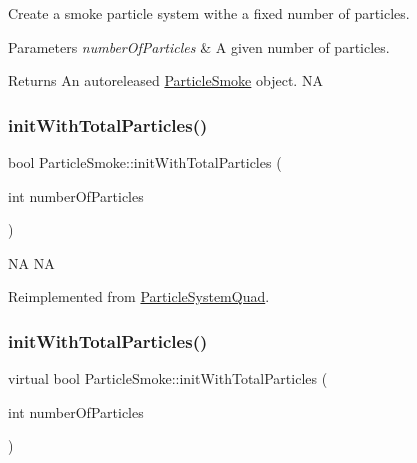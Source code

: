 Create a smoke particle system withe a fixed number of particles.


\begin{DoxyParams}{Parameters}
{\em number\+Of\+Particles} & A given number of particles. \\
\hline
\end{DoxyParams}
\begin{DoxyReturn}{Returns}
An autoreleased \hyperlink{classParticleSmoke}{Particle\+Smoke} object.  NA 
\end{DoxyReturn}
\mbox{\label{classParticleSmoke_a15a46a667c6fb570023fe68d94296b3e}} 
\subsubsection{\texorpdfstring{init\+With\+Total\+Particles()}{initWithTotalParticles()}\hspace{0.1cm}{\footnotesize\ttfamily [1/2]}}
{\footnotesize\ttfamily bool Particle\+Smoke\+::init\+With\+Total\+Particles (\begin{DoxyParamCaption}\item[{int}]{number\+Of\+Particles }\end{DoxyParamCaption})\hspace{0.3cm}{\ttfamily [virtual]}}

NA  NA 

Reimplemented from \hyperlink{classParticleSystemQuad_ae5420007b57e909c05e7476a54fbfbe9}{Particle\+System\+Quad}.

\mbox{\label{classParticleSmoke_ad06f80d20c4f8fec1d7d56beb478b72d}} 
\subsubsection{\texorpdfstring{init\+With\+Total\+Particles()}{initWithTotalParticles()}\hspace{0.1cm}{\footnotesize\ttfamily [2/2]}}
{\footnotesize\ttfamily virtual bool Particle\+Smoke\+::init\+With\+Total\+Particles (\begin{DoxyParamCaption}\item[{int}]{number\+Of\+Particles }\end{DoxyParamCaption})\hspace{0.3cm}{\ttfamily [virtual]}}

